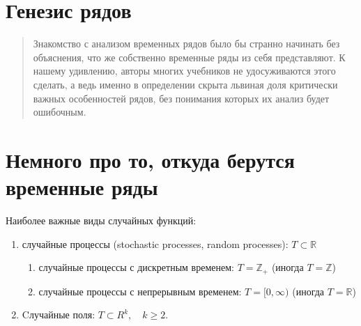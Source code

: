 \section{Генезис рядов}

\begin{quote}
  Знакомство с анализом временных рядов было бы странно начинать без
  объяснения, что же собственно временные ряды из себя представляют.
  К нашему удивлению, авторы многих учебников не удосуживаются этого
  сделать, а ведь именно в определении скрыта львиная доля критически важных
  особенностей рядов, без понимания которых их анализ будет ошибочным.
\end{quote}

\section*{Немного про то, откуда берутся временные ряды}


Наиболее важные виды случайных функций:
\begin{enumerate}
  \item случайные процессы (stochastic processes, random processes):
    \( T \subset \mathbb{R} \)
    \begin{enumerate}
      \item случайные процессы с дискретным временем: \( T =
        \mathbb{Z}_+ \) (иногда \( T = \mathbb{Z} \))
      \item случайные процессы с непрерывным временем: \( T = [0,
        \infty) \) (иногда \( T = \mathbb{R} \))
    \end{enumerate}
  \item Cлучайные поля: \( T \subset R^k, \quad k \geq 2 \).
\end{enumerate}


